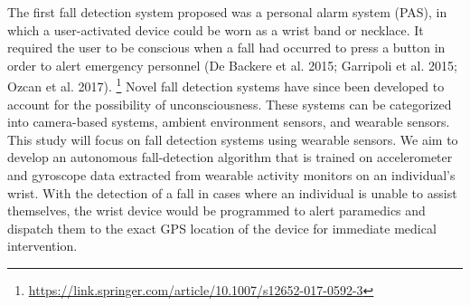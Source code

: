 \documentclass{llncs}
\begin{document}
	 The first fall detection system proposed was a personal alarm system (PAS), in which a user-activated device could be worn as a wrist band or necklace. It required the user to be conscious when a fall had occurred to press a button in order to alert emergency personnel (De Backere et al. 2015; Garripoli et al. 2015; Ozcan et al. 2017). \footnote{\url{https://link.springer.com/article/10.1007/s12652-017-0592-3}} Novel fall detection systems have since been developed to account for the possibility of unconsciousness. These systems can be categorized into camera-based systems, ambient environment sensors, and wearable sensors. This study will focus on fall detection systems using wearable sensors. We aim to develop an autonomous fall-detection algorithm that is trained on accelerometer and gyroscope data extracted from wearable activity monitors on an individual's wrist. With the detection of a fall in cases where an individual is unable to assist themselves, the wrist device would be programmed to alert paramedics and dispatch them to the exact GPS location of the device for immediate medical intervention. 
	
	
\end{document}
